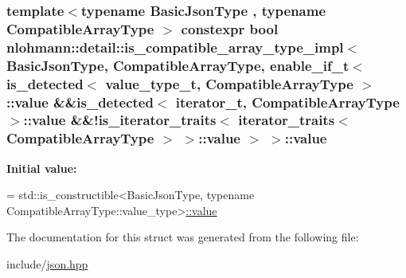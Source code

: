 \subsubsection[{\texorpdfstring{value}{value}}]{\setlength{\rightskip}{0pt plus 5cm}template$<$typename Basic\+Json\+Type , typename Compatible\+Array\+Type $>$ constexpr bool {\bf nlohmann\+::detail\+::is\+\_\+compatible\+\_\+array\+\_\+type\+\_\+impl}$<$ Basic\+Json\+Type, Compatible\+Array\+Type, {\bf enable\+\_\+if\+\_\+t}$<$ {\bf is\+\_\+detected}$<$ {\bf value\+\_\+type\+\_\+t}, Compatible\+Array\+Type $>$\+::value \&\&{\bf is\+\_\+detected}$<$ {\bf iterator\+\_\+t}, Compatible\+Array\+Type $>$\+::value \&\&!{\bf is\+\_\+iterator\+\_\+traits}$<$ {\bf iterator\+\_\+traits}$<$ Compatible\+Array\+Type $>$ $>$\+::value $>$ $>$\+::value\hspace{0.3cm}{\ttfamily [static]}}\hypertarget{structnlohmann_1_1detail_1_1is__compatible__array__type__impl_3_01BasicJsonType_00_01CompatibleAb638dd3c6149bb42b44d6778e8db3f9d_ab4a4e921f0676b2e25d1031ca486ddee}{}\label{structnlohmann_1_1detail_1_1is__compatible__array__type__impl_3_01BasicJsonType_00_01CompatibleAb638dd3c6149bb42b44d6778e8db3f9d_ab4a4e921f0676b2e25d1031ca486ddee}
{\bfseries Initial value\+:}
\begin{DoxyCode}
=
        std::is\_constructible<BasicJsonType,
        \textcolor{keyword}{typename} CompatibleArrayType::value\_type>\hyperlink{structnlohmann_1_1detail_1_1is__compatible__array__type__impl_3_01BasicJsonType_00_01CompatibleAb638dd3c6149bb42b44d6778e8db3f9d_ab4a4e921f0676b2e25d1031ca486ddee}{::value}
\end{DoxyCode}


The documentation for this struct was generated from the following file\+:\begin{DoxyCompactItemize}
\item 
include/\hyperlink{json_8hpp}{json.\+hpp}\end{DoxyCompactItemize}
